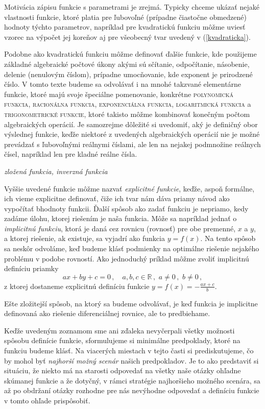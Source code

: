 Motivácia zápisu funkcie s parametrami je zrejmá. Typicky chceme ukázať nejaké vlastnosti funkcie, ktoré platia pre ľubovoľné (prípadne čiastočne obmedzené) hodnoty týchto parametrov, napríklad pre kvadratickú funkciu môžme uviesť vzorec na výpočet jej koreňov aj pre všeobecný tvar uvedený v (\ref{kvadraticka}).

Podobne ako kvadratickú funkciu môžme definovať ďalšie funkcie, kde použijeme základné algebraické počtové úkony akými sú sčítanie, odpočítanie, násobenie, delenie (nenulovým číslom), prípadne umocňovanie, kde exponent je prirodzené číslo. 
V tomto texte budeme sa odvolávať i na mnohé takzvané elementárne funkcie, ktoré majú svoje špeciálne pomenovanie, konkrétne \textsc{polynomická funkcia}, \textsc{racionálna  funkcia}, \textsc{exponenciálna funkcia}, \textsc{logaritmická funkcia} a \textsc{trigonometrické funkcie}, ktoré takisto môžme kombinovať konečným počtom algebraických operácií. Je samozrejme dôležité si uvedomiť, aký je definičný obor výslednej funkcie, keďže niektoré z uvedených algebraických operácií nie je možné prevádzať s ľubovoľnými reálnymi číslami, ale len na nejakej podmnožine reálnych čísel, napríklad len pre kladné reálne čísla.

{\it zložená funkcia, inverzná funkcia}

Vyššie uvedené funkcie môžme nazvať {\it explicitné funkcie}, keďže, aspoň formálne, ich vieme explicitne definovať, čiže ich tvar nám dáva priamy návod ako vypočítať bhodnoty funkcii.  Ďalší spôsob ako zadať funkciu je nepriamo, kedy zadáme úlohu, ktorej riešením je naša funkcia. Môže sa napríklad jednať o {\it implicitnú funkciu}, ktorá je daná cez rovnicu (rovnosť) pre obe premenné, $x$ a $y$, a ktorej riešenie, ak existuje, sa vyjadrí ako funkcia $y=f(x)$. Na tento spôsob sa neskôr odvoláme, keď budeme klásť podmienky na optimálne riešenie nejakého problému v podobe rovností. Ako jednoduchý príklad môžme zvoliť implicitnú definíciu priamky
$$
a x + b y + c = 0 \,, \quad a,b,c \in \mathbb{R} \,, \,\, a \neq 0 \,, \,\, b \neq 0 \,,
$$
z ktorej dostaneme explicitnú definíciu funkcie $y=f(x)=-\frac{a x + c}{b}$.

Ešte zložitejší spôsob, na ktorý sa budeme odvolávať, je keď funkcia je implicitne definovaná ako riešenie diferenciálnej rovnice, ale to predbiehame.

Keďže uvedeným zoznamom sme ani zďaleka nevyčerpali všetky možnosti spôsobu definície funkcie, sformulujeme si minimálne predpoklady, ktoré na funkciu budeme klásť. Na viacerých miestach v tejto časti si  prediskutujeme, čo by mohol byť {\it najhorší možný scenár} našich predpokladov. Je to ako predstaviť si situáciu, že niekto má na starosti odpovedať na všetky naše otázky ohľadne skúmanej funkcie a že dotyčný, v rámci stratégie najhoršieho možného scenára, sa až po obdržaní otázky rozhodne  pre nás nevýhodne odpovedať a definíciu funkcie v tomto ohľade prispôsobiť.

